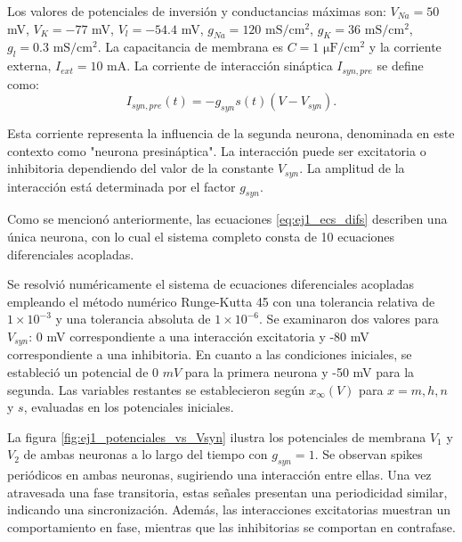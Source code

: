 \documentclass[aps,prb,twocolumn,superscriptaddress,floatfix,longbibliography]{revtex4-2}
\newcounter{para}
\begin{document}
Los valores de potenciales de inversión y conductancias máximas son: $V_{Na} = 50$ mV, $V_K = -77$ mV, $V_l = -54.4$ mV, $g_{Na} = 120$ $\mathrm{mS/cm^2}$, $g_K = 36$ $\mathrm{mS/cm^2}$, $g_l = 0.3$ $\mathrm{mS/cm^2}$. La capacitancia de membrana es $C = 1$ $\mathrm{\mu F/cm^2}$ y la corriente externa, $I_{ext} = 10$ mA. La corriente de interacción sináptica $I_{syn, pre}$ se define como:
\[I_{syn, pre}(t) = -g_{syn} s(t) (V - V_{syn}).\]

Esta corriente representa la influencia de la segunda neurona, denominada en este contexto como "neurona presináptica". La interacción puede ser excitatoria o inhibitoria dependiendo del valor de la constante $V_{syn}$. La amplitud de la interacción está determinada por el factor $g_{syn}$.

Como se mencionó anteriormente, las ecuaciones \ref{eq:ej1_ecs_difs} describen una única neurona, con lo cual el sistema completo consta de 10 ecuaciones diferenciales acopladas.

Se resolvió numéricamente el sistema de ecuaciones diferenciales acopladas empleando el método numérico Runge-Kutta 45 con una tolerancia relativa de $1\times 10^{-3}$ y una tolerancia absoluta de $1 \times 10^{-6}$. Se examinaron dos valores para \(V_{syn}\): 0 mV correspondiente a una interacción excitatoria y -80 mV correspondiente a una inhibitoria. En cuanto a las condiciones iniciales, se estableció un potencial de 0 \(mV\) para la primera neurona y -50 mV para la segunda. Las variables restantes se establecieron según \(x_\infty(V)\) para \(x = m, h, n\) y \(s\), evaluadas en los potenciales iniciales.

La figura \ref{fig:ej1_potenciales_vs_Vsyn} ilustra los potenciales de membrana \(V_1\) y \(V_2\) de ambas neuronas a lo largo del tiempo con \(g_{syn} = 1\). Se observan spikes periódicos en ambas neuronas, sugiriendo una interacción entre ellas. Una vez atravesada una fase transitoria, estas señales presentan una periodicidad similar, indicando una sincronización. Además, las interacciones excitatorias muestran un comportamiento en fase, mientras que las inhibitorias se comportan en contrafase.
\end{document}
